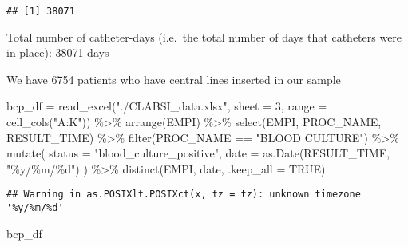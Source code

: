 \documentclass[
]{article}
\newenvironment{Shaded}{\begin{snugshade}}{\end{snugshade}}
\newcommand{\AttributeTok}[1]{\textcolor[rgb]{0.77,0.63,0.00}{#1}}
\newcommand{\ConstantTok}[1]{\textcolor[rgb]{0.00,0.00,0.00}{#1}}
\newcommand{\DecValTok}[1]{\textcolor[rgb]{0.00,0.00,0.81}{#1}}
\newcommand{\FunctionTok}[1]{\textcolor[rgb]{0.00,0.00,0.00}{#1}}
\newcommand{\NormalTok}[1]{#1}
\newcommand{\OtherTok}[1]{\textcolor[rgb]{0.56,0.35,0.01}{#1}}
\newcommand{\SpecialCharTok}[1]{\textcolor[rgb]{0.00,0.00,0.00}{#1}}
\newcommand{\StringTok}[1]{\textcolor[rgb]{0.31,0.60,0.02}{#1}}
\begin{document}
\begin{Shaded}
\end{Shaded}

\begin{verbatim}
## [1] 38071
\end{verbatim}

Total number of catheter-days (i.e.~the total number of days that
catheters were in place): 38071 days

We have 6754 patients who have central lines inserted in our sample

\begin{Shaded}
\begin{Highlighting}[]
\NormalTok{bcp\_df }\OtherTok{=}
  \FunctionTok{read\_excel}\NormalTok{(}\StringTok{"./CLABSI\_data.xlsx"}\NormalTok{, }\AttributeTok{sheet =} \DecValTok{3}\NormalTok{, }\AttributeTok{range =} \FunctionTok{cell\_cols}\NormalTok{(}\StringTok{"A:K"}\NormalTok{)) }\SpecialCharTok{\%\textgreater{}\%} 
  \FunctionTok{arrange}\NormalTok{(EMPI) }\SpecialCharTok{\%\textgreater{}\%} 
  \FunctionTok{select}\NormalTok{(EMPI, PROC\_NAME, RESULT\_TIME) }\SpecialCharTok{\%\textgreater{}\%} 
  \FunctionTok{filter}\NormalTok{(PROC\_NAME }\SpecialCharTok{==} \StringTok{"BLOOD CULTURE"}\NormalTok{) }\SpecialCharTok{\%\textgreater{}\%} 
  \FunctionTok{mutate}\NormalTok{(}
  \AttributeTok{status =} \StringTok{"blood\_culture\_positive"}\NormalTok{,}
  \AttributeTok{date =} \FunctionTok{as.Date}\NormalTok{(RESULT\_TIME, }\StringTok{"\%y/\%m/\%d"}\NormalTok{)}
\NormalTok{)  }\SpecialCharTok{\%\textgreater{}\%} 
  \FunctionTok{distinct}\NormalTok{(EMPI, date, }\AttributeTok{.keep\_all =} \ConstantTok{TRUE}\NormalTok{)}
\end{Highlighting}
\end{Shaded}

\begin{verbatim}
## Warning in as.POSIXlt.POSIXct(x, tz = tz): unknown timezone '%y/%m/%d'
\end{verbatim}

\begin{Shaded}
\begin{Highlighting}[]
\NormalTok{bcp\_df}
\end{Highlighting}
\end{Shaded}
\end{document}
